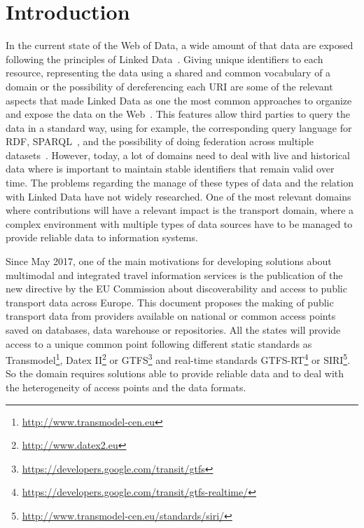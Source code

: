 \documentclass[sw]{iosart2x}
\begin{document}
\section{Introduction}\label{introduction} %
In the current state of the Web of Data, a wide amount of that data are exposed following the principles of Linked Data~\cite{bizer2009linked}. Giving unique identifiers to each resource, representing the data using a shared and common vocabulary of a domain or the possibility of dereferencing each URI are some of the relevant aspects that made Linked Data as one the most common approaches to organize and expose the data on the Web~\cite{heath2011linked}. This features allow third parties to query the data in a standard way, using for example, the corresponding query language for RDF, SPARQL~\cite{prud2006sparql}, and the possibility of doing federation across multiple datasets~\cite{buil2013federating}. However, today, a lot of domains need to deal with live and historical data where is important to maintain stable identifiers that remain valid over time. The problems regarding the manage of these types of data and the relation with Linked Data have not widely researched. One of the most relevant domains where contributions will have a relevant impact is the transport domain, where a complex environment with multiple types of data sources have to be managed to provide reliable data to information systems.

Since May 2017, one of the main motivations for developing solutions about multimodal and integrated travel information services is the publication of the new directive by the EU Commission about discoverability and access to public transport data across Europe. This document proposes the making of public transport data from providers available on national or common access points saved on databases, data warehouse or repositories. All the states will provide access to a unique common point following different static standards as Transmodel\footnote{\url{http://www.transmodel-cen.eu}}, Datex II\footnote{\url{http://www.datex2.eu}} or GTFS\footnote{\url{https://developers.google.com/transit/gtfs}} and real-time standards GTFS-RT\footnote{\url{https://developers.google.com/transit/gtfs-realtime/}} or SIRI\footnote{\url{http://www.transmodel-cen.eu/standards/siri/}}. So the domain requires solutions able to provide reliable data and to deal with the heterogeneity of access points and the data formats.
\end{document}
